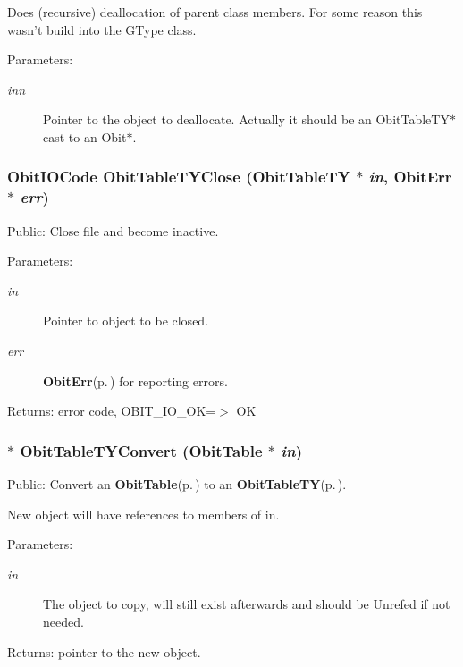 Does (recursive) deallocation of parent class members. For some reason this wasn't build into the GType class. \begin{Desc}
\item[Parameters:]
\begin{description}
\item[{\em inn}]Pointer to the object to deallocate. Actually it should be an Obit\-Table\-TY$\ast$ cast to an Obit$\ast$. \end{description}
\end{Desc}
\subsubsection{\setlength{\rightskip}{0pt plus 5cm}Obit\-IOCode Obit\-Table\-TYClose ({\bf Obit\-Table\-TY} $\ast$ {\em in}, {\bf Obit\-Err} $\ast$ {\em err})}\label{ObitTableTY_8c_a25}


Public: Close file and become inactive. 

\begin{Desc}
\item[Parameters:]
\begin{description}
\item[{\em in}]Pointer to object to be closed. \item[{\em err}]{\bf Obit\-Err}{\rm (p.\,\pageref{structObitErr})} for reporting errors. \end{description}
\end{Desc}
\begin{Desc}
\item[Returns:]error code, OBIT\_\-IO\_\-OK=$>$ OK \end{Desc}
\subsubsection{$\ast$ Obit\-Table\-TYConvert ({\bf Obit\-Table} $\ast$ {\em in})}\label{ObitTableTY_8c_a19}


Public: Convert an {\bf Obit\-Table}{\rm (p.\,\pageref{structObitTable})} to an {\bf Obit\-Table\-TY}{\rm (p.\,\pageref{structObitTableTY})}. 

New object will have references to members of in. \begin{Desc}
\item[Parameters:]
\begin{description}
\item[{\em in}]The object to copy, will still exist afterwards and should be Unrefed if not needed. \end{description}
\end{Desc}
\begin{Desc}
\item[Returns:]pointer to the new object. \end{Desc}
